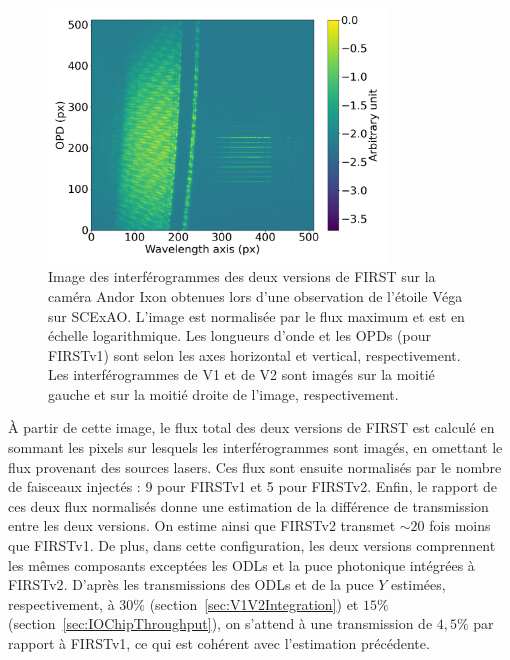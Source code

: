 \begin{figure}[ht!]
    \centering
    \includegraphics[width=0.8\textwidth]{Figure_Chap5/20220224_Vega_V1V2_FullOn_010_Image100_logscale.png}
    \caption[Image des interférogrammes des deux versions de FIRST sur la caméra Andor Ixon obtenues lors d'une observation de l'étoile Véga sur SCExAO.]{Image des interférogrammes des deux versions de FIRST sur la caméra Andor Ixon obtenues lors d'une observation de l'étoile Véga sur SCExAO. L'image est normalisée par le flux maximum et est en échelle logarithmique. Les longueurs d'onde et les OPDs (pour FIRSTv1) sont selon les axes horizontal et vertical, respectivement. Les interférogrammes de V1 et de V2 sont imagés sur la moitié gauche et sur la moitié droite de l'image, respectivement.}
    \label{fig:V1V2Vega}
\end{figure}

À partir de cette image, le flux total des deux versions de \ac{FIRST} est calculé en sommant les pixels sur lesquels les interférogrammes sont imagés, en omettant le flux provenant des sources lasers. Ces flux sont ensuite normalisés par le nombre de faisceaux injectés : 9 pour \ac{FIRSTv1} et 5 pour \ac{FIRSTv2}. Enfin, le rapport de ces deux flux normalisés donne une estimation de la différence de transmission entre les deux versions. On estime ainsi que \ac{FIRSTv2} transmet $\sim 20$ fois moins que \ac{FIRSTv1}. De plus, dans cette configuration, les deux versions comprennent les mêmes composants exceptées les \ac{ODL}s et la puce photonique intégrées à \ac{FIRSTv2}. D'après les transmissions des \ac{ODL}s et de la puce $Y$ estimées, respectivement, à $30\%$ (section~\ref{sec:V1V2Integration}) et $15 \%$ (section~\ref{sec:IOChipThroughput}), on s'attend à une transmission de $4,5\%$ par rapport à \ac{FIRSTv1}, ce qui est cohérent avec l'estimation précédente.


